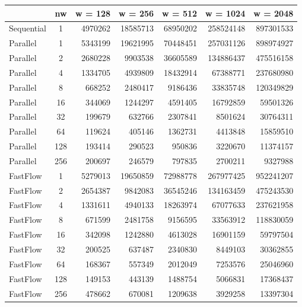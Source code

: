 \begin{tabular}{|l|c|r|r|r|r|r|}
\hline
           & nw  & w = 128 & w = 256  & w = 512  & w = 1024  & w = 2048  \\ \hline
Sequential & 1   & 4970262 & 18585713 & 68950202 & 258524148 & 897301533 \\ \hline
Parallel   & 1   & 5343199 & 19621995 & 70448451 & 257031126 & 898974927 \\ \hline
Parallel   & 2   & 2680228 & 9903538  & 36605589 & 134886437 & 475516158 \\ \hline
Parallel   & 4   & 1334705 & 4939809  & 18432914 & 67388771  & 237680980 \\ \hline
Parallel   & 8   & 668252  & 2480417  & 9186436  & 33835748  & 120349829 \\ \hline
Parallel   & 16  & 344069  & 1244297  & 4591405  & 16792859  & 59501326  \\ \hline
Parallel   & 32  & 199679  & 632766   & 2307841  & 8501624   & 30764311  \\ \hline
Parallel   & 64  & 119624  & 405146   & 1362731  & 4413848   & 15859510  \\ \hline
Parallel   & 128 & 193414  & 290523   & 950836   & 3220670   & 11374157  \\ \hline
Parallel   & 256 & 200697  & 246579   & 797835   & 2700211   & 9327988   \\ \hline
FastFlow   & 1   & 5279013 & 19650859 & 72988778 & 267977425 & 952241207 \\ \hline
FastFlow   & 2   & 2654387 & 9842083  & 36545246 & 134163459 & 475243530 \\ \hline
FastFlow   & 4   & 1331611 & 4940133  & 18263974 & 67077633  & 237621958 \\ \hline
FastFlow   & 8   & 671599  & 2481758  & 9156595  & 33563912  & 118830059 \\ \hline
FastFlow   & 16  & 342098  & 1242880  & 4613028  & 16901159  & 59797504  \\ \hline
FastFlow   & 32  & 200525  & 637487   & 2340830  & 8449103   & 30362855  \\ \hline
FastFlow   & 64  & 168367  & 557349   & 2012049  & 7253576   & 25046960  \\ \hline
FastFlow   & 128 & 149153  & 443139   & 1488754  & 5066831   & 17368437  \\ \hline
FastFlow   & 256 & 478662  & 670081   & 1209638  & 3929258   & 13397304  \\ \hline
\end{tabular}